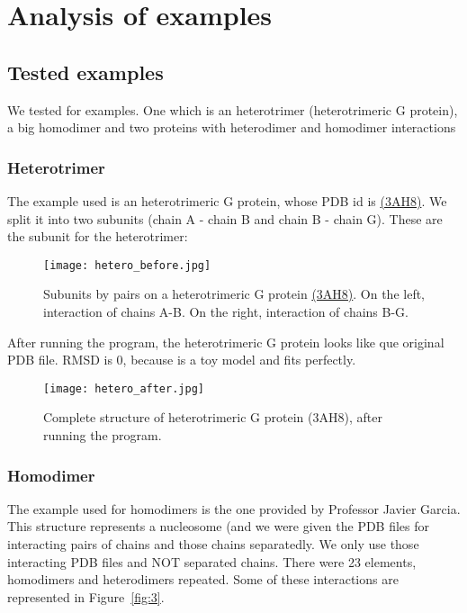 \documentclass[a4paper,10pt]{report}
\begin{document}
\chapter{Analysis of examples}

\section{Tested examples}

We tested for examples. One which is an heterotrimer (heterotrimeric G protein), a big homodimer and two proteins with heterodimer and homodimer interactions

\subsection{Heterotrimer}

The example used is an heterotrimeric G protein, whose PDB id is \href{https://www.rcsb.org/structure/3ah8}{(3AH8)}. We split it into two subunits (chain A - chain B and chain B - chain G). These are the subunit for the heterotrimer:

\begin{figure}[h]
\centering
\texttt{[image: hetero\_before.jpg]}
\caption{Subunits by pairs on a heterotrimeric G protein \href{https://www.rcsb.org/structure/3ah8}{(3AH8)}. On the left, interaction of chains A-B. On the right, interaction of chains B-G.}
\label{fig:1}
\end{figure}

\noindent
After running the program, the heterotrimeric G protein looks like que original PDB file. RMSD is 0, because is a toy model and fits perfectly.

\begin{figure}[h]
\centering
\texttt{[image: hetero\_after.jpg]}
\caption{Complete structure of heterotrimeric G protein (3AH8), after running the program.}
\label{fig:2}
\end{figure}

\newpage

\subsection{Homodimer}

The example used for homodimers is the one provided by Professor Javier Garcia. This structure represents a nucleosome (and we were given the PDB files for interacting pairs of chains and those chains separatedly. We only use those interacting PDB files and NOT separated chains. There were 23 elements, homodimers and heterodimers repeated. Some of these interactions are represented in Figure~\ref{fig:3}.\\
\end{document}
